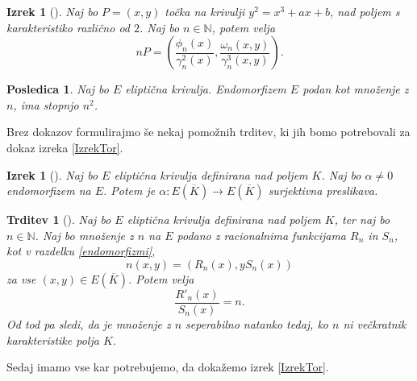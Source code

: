 \documentclass[12pt,a4paper,twoside]{article}
\theoremstyle{definition} %
\theoremstyle{plain} %
\newtheorem{izrek}[definicija]{Izrek}
\newtheorem{trditev}[definicija]{Trditev}
\newtheorem{posledica}[definicija]{Posledica}
\numberwithin{equation}{section}  %
\newcommand{\N}{\mathbb N}
\newcommand{\E}[1]{E({#1})}
\begin{document}
\begin{izrek}[]

\label{izrek:3.6}
Naj bo $P = (x,y)$ točka na krivulji $y^2 = x^3+ax+b$, nad poljem s karakteristiko različno od $2$. Naj bo $n\in \N$, potem velja
$$nP = \left( \frac{\phi_n(x)}{\gamma^2_n(x)}, \frac{\omega_n(x,y)}{\gamma^3_n(x,y)}\right).$$


\end{izrek}

\begin{posledica}
\label{posledica:3.7}
Naj bo $E$ eliptična krivulja. Endomorfizem $E$ podan kot množenje z $n$, ima stopnjo $n^2$.
\end{posledica}

Brez dokazov formulirajmo še nekaj pomožnih trditev, ki jih bomo potrebovali za dokaz izreka \ref{IzrekTor}.

\begin{izrek}[]
\label{izrek:2.22}
Naj bo $E$ eliptična krivulja definirana nad poljem $K$. Naj bo $\alpha \neq 0$ endomorfizem na $E$. Potem je $\alpha: \E{\overline{K}} \rightarrow \E{\overline{K}}$ surjektivna preslikava.

\end{izrek}

\begin{trditev}[]
\label{trditev:2.28}
Naj bo $E$ eliptična krivulja definirana nad poljem $K$, ter naj bo $n\in \N$. Naj bo množenje z $n$ na $E$ podano z racionalnima funkcijama $R_n$ in $S_n$, kot v razdelku \ref{endomorfizmi},
$$n(x,y) = (R_n(x),yS_n(x))$$
za vse $(x,y) \in \E{\overline{K}}$. Potem velja
$$\frac{R'_n(x)}{S_n(x)} = n.$$
Od tod pa sledi, da je množenje z $n$ seperabilno natanko tedaj, ko $n$ ni večkratnik karakteristike polja $K$. 
\end{trditev}

Sedaj imamo vse kar potrebujemo, da dokažemo izrek \ref{IzrekTor}.
\end{document}
